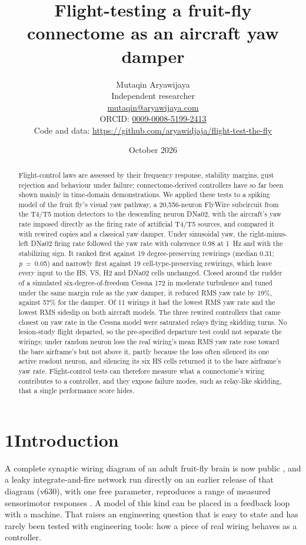 \documentclass[11pt,letterpaper]{article}
\title{Flight-testing a fruit-fly connectome as an aircraft yaw damper}
\author{Mutaqin
Aryawijaya\\[2pt] \normalsize Independent researcher\\[1pt] \small \href{mailto:mutaqin@aryawijaya.com}{mutaqin@aryawijaya.com}\\[1pt] \small ORCID: \href{https://orcid.org/0009-0008-5199-2413}{0009-0008-5199-2413}\\[2pt] \small Code and data: \url{https://github.com/aryawidjaja/flight-test-the-fly}}
\date{October 2026}
\begin{document}
\maketitle
\begin{abstract}
\noindent Flight-control laws are assessed by their frequency response,
stability margins, gust rejection and behaviour under failure;
connectome-derived controllers have so far been shown mainly in
time-domain demonstrations. We applied these tests to a spiking model of
the fruit fly's visual yaw pathway, a 20,556-neuron FlyWire subcircuit
from the T4/T5 motion detectors to the descending neuron DNa02, with the
aircraft's yaw rate imposed directly as the firing rate of artificial
T4/T5 sources, and compared it with rewired copies and a classical yaw
damper. Under sinusoidal yaw, the right-minus-left DNa02 firing rate
followed the yaw rate with coherence 0.98 at 1~Hz and with the
stabilizing sign. It ranked first against 19 degree-preserving rewirings
(median 0.31; \emph{p}~=~0.05) and narrowly first against 19
cell-type-preserving rewirings, which leave every input to the HS, VS,
H2 and DNa02 cells unchanged. Closed around the rudder of a simulated
six-degree-of-freedom Cessna 172 in moderate turbulence and tuned under
the same margin rule as the yaw damper, it reduced RMS yaw rate by 19\%,
against 57\% for the damper. Of 11 wirings it had the lowest RMS yaw
rate and the lowest RMS sideslip on both aircraft models. The three
rewired controllers that came closest on yaw rate in the Cessna model
were saturated relays flying skidding turns. No lesion-study flight
departed, so the pre-specified departure test could not separate the
wirings; under random neuron loss the real wiring's mean RMS yaw rate
rose toward the bare airframe's but not above it, partly because the
loss often silenced its one active readout neuron, and silencing its six
HS cells returned it to the bare airframe's yaw rate. Flight-control
tests can therefore measure what a connectome's wiring contributes to a
controller, and they expose failure modes, such as relay-like skidding,
that a single performance score hides.
\end{abstract}

\protect{}\label{s1}
\section{\texorpdfstring{1\quad Introduction}{1Introduction}}\label{introduction}

\noindent A complete synaptic wiring diagram of an adult fruit-fly brain
is now public \cite{dorkenwald2024,schlegel2024}, and a leaky
integrate-and-fire network run directly on an earlier release of that
diagram (v630), with one free parameter, reproduces a range of measured
sensorimotor responses \cite{shiu2024}. A model of this kind can be
placed in a feedback loop with a machine. That raises an engineering
question that is easy to state and has rarely been tested with
engineering tools: how a piece of real wiring behaves as a controller.
\end{document}
